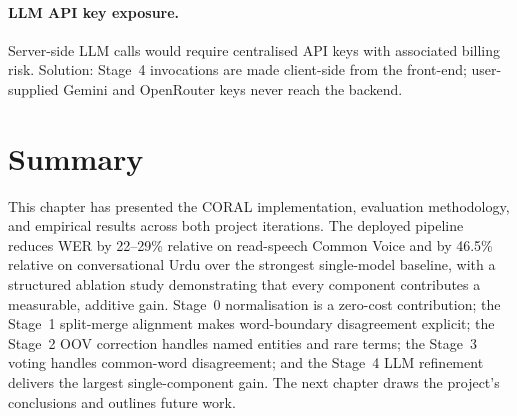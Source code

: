 \paragraph{LLM API key exposure.}
Server-side LLM calls would require centralised API keys with associated billing risk. Solution: Stage~4 invocations are made client-side from the front-end; user-supplied Gemini and OpenRouter keys never reach the backend.

\section{Summary}
\label{sec:ch4-summary}

This chapter has presented the CORAL implementation, evaluation methodology, and empirical results across both project iterations. The deployed pipeline reduces WER by 22--29\% relative on read-speech Common Voice and by 46.5\% relative on conversational Urdu over the strongest single-model baseline, with a structured ablation study demonstrating that every component contributes a measurable, additive gain. Stage~0 normalisation is a zero-cost contribution; the Stage~1 split-merge alignment makes word-boundary disagreement explicit; the Stage~2 OOV correction handles named entities and rare terms; the Stage~3 voting handles common-word disagreement; and the Stage~4 LLM refinement delivers the largest single-component gain. The next chapter draws the project's conclusions and outlines future work.
